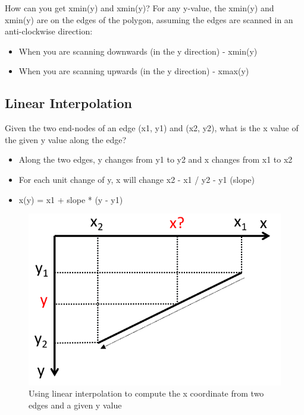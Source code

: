 \documentclass[
]{book}
\providecommand{\tightlist}{%
  \setlength{\itemsep}{0pt}\setlength{\parskip}{0pt}}
\begin{document}
How can you get xmin(y) and xmin(y)? For any y-value, the xmin(y) and xmin(y) are on the edges of the polygon, assuming the edges are scanned in an {anti-clockwise} direction:

\begin{itemize}
\tightlist
\item
  When you are scanning downwards (in the y direction) - xmin(y)
\item
  When you are scanning upwards (in the y direction) - xmax(y)
\end{itemize}

\hypertarget{linear-interpolation}{%
\subsection{Linear Interpolation}\label{linear-interpolation}}

Given the two end-nodes of an edge (x1, y1) and (x2, y2), what is the x value of the given y value along the edge?

\begin{itemize}
\item
  Along the two edges, y changes from y1 to y2 and x changes from x1 to x2
\item
  For each unit change of y, x will change x2 - x1 / y2 - y1 ({slope})
\item
  {x(y) = x1 + slope * (y - y1)}
\end{itemize}

\begin{figure}
\centering
\includegraphics{img/08-image33.png}
\caption{\label{fig:linear-interp}Using linear interpolation to compute the x coordinate from two edges and a given y value}
\end{figure}
\end{document}
